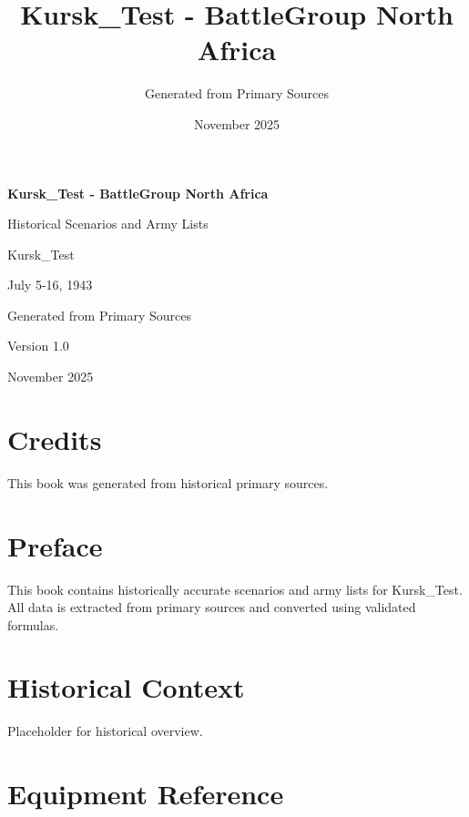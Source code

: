 \documentclass[11pt,letterpaper,twoside]{book}
\title{Kursk\_Test - BattleGroup North Africa}
\author{Generated from Primary Sources}
\date{November 2025}
\begin{document}
\begin{titlepage}
  \centering
  \vspace*{2cm}

  {\Huge\bfseries Kursk\_Test - BattleGroup North Africa\par}
  \vspace{0.5cm}
  {\Large Historical Scenarios and Army Lists\par}
  \vspace{2cm}

  {\large Kursk\_Test\par}
  {\large July 5-16, 1943\par}
  \vspace{1cm}

  \vfill

  {\large Generated from Primary Sources\par}
  {\large Version 1.0\par}
  {\large November 2025\par}
\end{titlepage}

\chapter*{Credits}

This book was generated from historical primary sources.

\tableofcontents
\clearpage

\chapter*{Preface}

This book contains historically accurate scenarios and army lists for Kursk\_Test.
All data is extracted from primary sources and converted using validated formulas.

\chapter{Historical Context}

Placeholder for historical overview.

\chapter{Equipment Reference}
\end{document}

